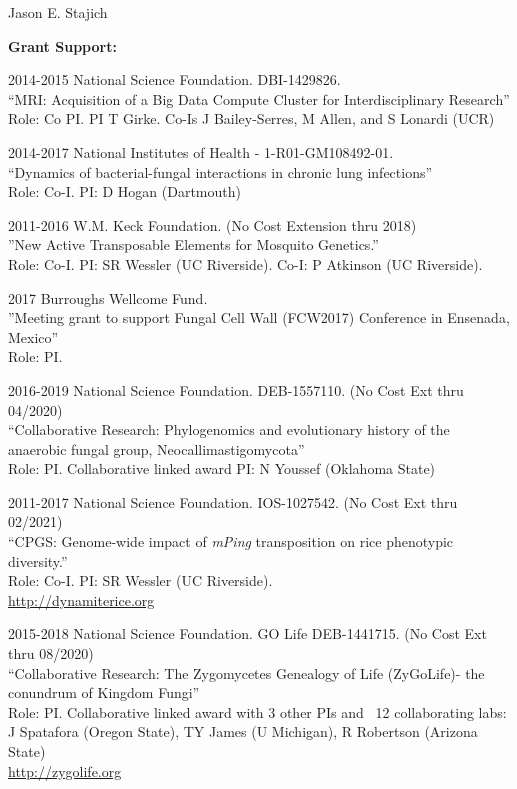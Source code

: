 \documentclass[10pt]{article}
\begin{document}
\begin{cv}{\centerline{Jason E. Stajich}}
\begin{cvlistcompact}{\bf Grant Support:}
\item [2014-2015] National Science Foundation. DBI-1429826. \\
``MRI: Acquisition of a Big Data Compute Cluster for Interdisciplinary
  Research''
Role: Co PI. PI T Girke. Co-Is J Bailey-Serres, M Allen, and S Lonardi (UCR)

\item [2014-2017] National Institutes of Health - 1-R01-GM108492-01. \\
``Dynamics of bacterial-fungal interactions in chronic lung infections'' \\
  Role: Co-I. PI: D Hogan (Dartmouth)

  \item [2011-2016] W.M. Keck Foundation. (No Cost Extension thru 2018) \\
''New Active Transposable Elements for Mosquito Genetics.'' \\
Role: Co-I. PI: SR Wessler (UC Riverside). Co-I: P Atkinson (UC Riverside).

\item [2017] Burroughs Wellcome Fund. \\
''Meeting grant to support Fungal Cell Wall (FCW2017) Conference in Ensenada, Mexico'' \\
Role: PI.

\item [2016-2019] National Science Foundation. DEB-1557110. (No Cost Ext thru 04/2020) \\
``Collaborative Research: Phylogenomics and evolutionary history of the anaerobic fungal group, Neocallimastigomycota'' \\
Role: PI. Collaborative linked award PI: N Youssef (Oklahoma State)

\item [2011-2017] National Science Foundation. IOS-1027542.  (No Cost Ext thru 02/2021) \\
  ``CPGS: Genome-wide impact of \textit{mPing} transposition on rice phenotypic diversity.'' \\
Role: Co-I. PI: SR Wessler (UC Riverside). \\
\url{http://dynamiterice.org}

\item [2015-2018] National Science Foundation. GO Life DEB-1441715. (No Cost Ext thru 08/2020) \\
``Collaborative Research: The Zygomycetes Genealogy of Life
  (ZyGoLife)- the conundrum of Kingdom Fungi'' \\
  Role: PI. Collaborative linked award with 3 other PIs and ~12
  collaborating labs: J Spatafora (Oregon State), TY James (U
  Michigan), R Robertson (Arizona State) \\
\url{http://zygolife.org}


\end{cvlistcompact}
\end{cv}
\end{document}
